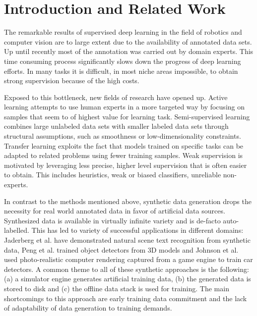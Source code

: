 \documentclass[conference]{IEEEtran}
\begin{document}
\section{Introduction and Related Work}
The remarkable results of supervised deep learning in the field of robotics and computer vision are to large extent due to the availability of annotated data sets. Up until recently most of the annotation was carried out by domain experts. This time consuming process significantly slows down the progress of deep learning efforts. In many tasks it is difficult, in most niche areas impossible, to obtain strong supervision because of the high costs.

Exposed to this bottleneck, new fields of research have opened up. Active learning \cite{druck2009active, settles2012active, cakmak2012designing} attempts to use human experts in a more targeted way by focusing on samples that seem to of highest value for learning task. Semi-supervised learning \cite{chapelle2009semi, salimans2016improved, zhu2006semi} combines large unlabeled data sets with smaller labeled data sets through structural assumptions, such as smoothness or low-dimensionality constraints. Transfer learning \cite{pratt1993discriminability, ventura2007theoretical, pan2010survey} exploits the fact that models trained on specific tasks can be adapted to related problems using fewer training samples. Weak supervision \cite{ratner2016data, zhou2017brief} is motivated by leveraging less precise, higher level supervision that is often easier to obtain. This includes heuristics, weak or biased classifiers, unreliable non-experts. 


In contrast to the methods mentioned above, synthetic data generation drops the necessity for real world annotated data in favor of artificial data sources. Synthesized data is available in virtually infinite variety and is de-facto auto-labelled. This has led to variety of successful applications in different domains: Jaderberg et al. \cite{jaderberg2014synthetic} have demonstrated natural scene text recognition from synthetic data, Peng et al. \cite{peng2015learning} trained object detectors from 3D models and Johnson et al. \cite{2017_Johnson_DrivingInTheMatrix} used photo-realistic computer rendering captured from a game engine to train car detectors. A common theme to all of these synthetic approaches is the following: (a) a simulator engine generates artificial training data, (b) the generated data is stored to disk and (c) the offline data stack is used for training. The main shortcomings to this approach are early training data commitment and the lack of adaptability of data generation to training demands.
\end{document}
